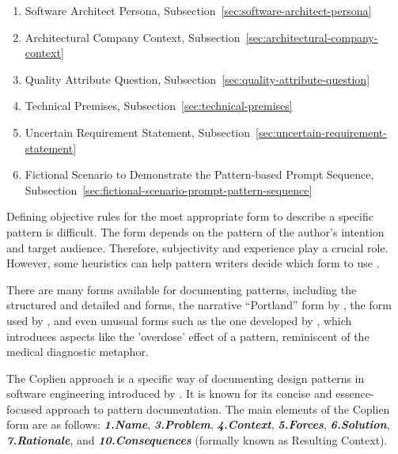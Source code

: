 \begin{enumerate}
    \item Software Architect Persona, Subsection~\ref{sec:software-architect-persona}
    \item Architectural Company Context, Subsection~\ref{sec:architectural-company-context}
    \item Quality Attribute Question, Subsection~\ref{sec:quality-attribute-question}
    \item Technical Premises, Subsection~\ref{sec:technical-premises}
    \item Uncertain Requirement Statement, Subsection~\ref{sec:uncertain-requirement-statement}
    \item Fictional Scenario to Demonstrate the Pattern-based Prompt Sequence, Subsection~\ref{sec:fictional-scenario-prompt-pattern-sequence}
\end{enumerate}


Defining objective rules for the most appropriate form to describe a specific pattern is difficult. The form depends on the pattern of the author's intention and target audience. Therefore, subjectivity and experience play a crucial role. However, some heuristics can help pattern writers decide which form to use \cite{buschmann2007pattern}.

There are many forms available for documenting patterns, including the structured and detailed \textcite{Gamma1994} and  \textcite{buschmann1996pattern} forms, the narrative ``Portland'' form by \textcite{cunningham1995checks}, the form used by \textcite{Alexander1977}, and even unusual forms such as the one developed by \textcite{cockburn1997surviving}, which introduces aspects like the 'overdose' effect of a pattern, reminiscent of the medical diagnostic metaphor.

The Coplien approach is a specific way of documenting design patterns in software engineering introduced by \textcite{coplien1995generative}. It is known for its concise and essence-focused approach to pattern documentation. The main elements of the Coplien form are as follows: \textbf{\textit{1.Name}}, \textbf{\textit{ 3.Problem}}, \textbf{\textit{4.Context}}, \textbf{\textit{5.Forces}}, \textbf{\textit{6.Solution}}, \textbf{\textit{7.Rationale}}, and \textbf{\textit{10.Consequences}} (formally known as Resulting Context).


